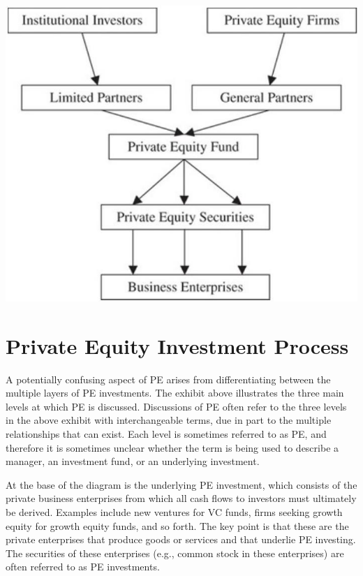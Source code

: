 \documentclass[11pt]{article}
\begin{document}
\begin{center}
\includegraphics[max width=\textwidth]{2024_04_10_0f4705c4c528462354f4g-2}
\end{center}

\section*{Private Equity Investment Process}
A potentially confusing aspect of PE arises from differentiating between the multiple layers of PE investments. The exhibit above illustrates the three main levels at which PE is discussed. Discussions of PE often refer to the three levels in the above exhibit with interchangeable terms, due in part to the multiple relationships that can exist. Each level is sometimes referred to as PE, and therefore it is sometimes unclear whether the term is being used to describe a manager, an investment fund, or an underlying investment.

At the base of the diagram is the underlying PE investment, which consists of the private business enterprises from which all cash flows to investors must ultimately be derived. Examples include new ventures for VC funds, firms seeking growth equity for growth equity funds, and so forth. The key point is that these are the private enterprises that produce goods or services and that underlie PE investing. The securities of these enterprises (e.g., common stock in these enterprises) are often referred to as PE investments.
\end{document}
